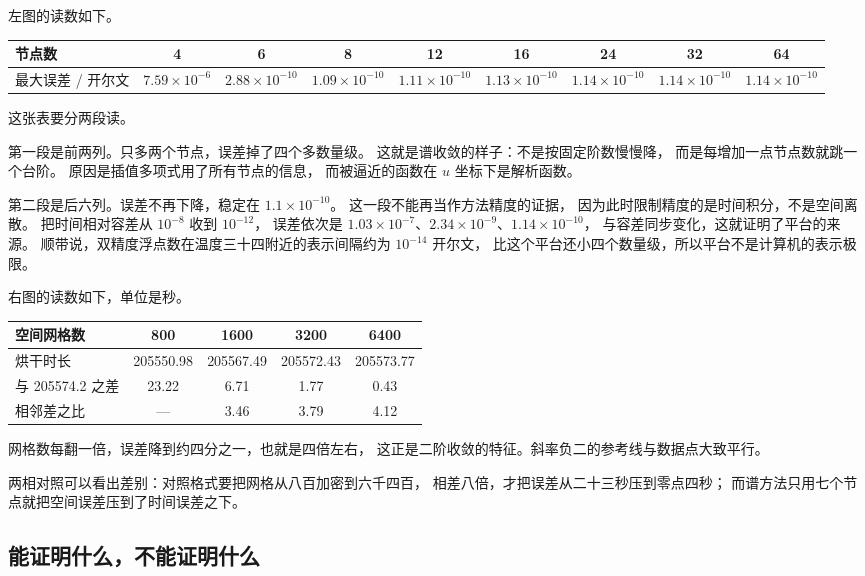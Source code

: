 \documentclass[11pt,a4paper]{article}
\begin{document}
左图的读数如下。

\begin{center}
\begin{tabular}{@{}lcccccccc@{}}
\toprule
节点数 & 4 & 6 & 8 & 12 & 16 & 24 & 32 & 64 \\
\midrule
最大误差 / 开尔文 & $7.59\times10^{-6}$ & $2.88\times10^{-10}$ & $1.09\times10^{-10}$
& $1.11\times10^{-10}$ & $1.13\times10^{-10}$ & $1.14\times10^{-10}$
& $1.14\times10^{-10}$ & $1.14\times10^{-10}$ \\
\bottomrule
\end{tabular}
\end{center}

这张表要分两段读。

第一段是前两列。只多两个节点，误差掉了四个多数量级。
这就是谱收敛的样子：不是按固定阶数慢慢降，
而是每增加一点节点数就跳一个台阶。
原因是插值多项式用了所有节点的信息，
而被逼近的函数在 $u$ 坐标下是解析函数。

第二段是后六列。误差不再下降，稳定在 $1.1\times10^{-10}$。
这一段不能再当作方法精度的证据，
因为此时限制精度的是时间积分，不是空间离散。
把时间相对容差从 $10^{-8}$ 收到 $10^{-12}$，
误差依次是 $1.03\times10^{-7}$、$2.34\times10^{-9}$、$1.14\times10^{-10}$，
与容差同步变化，这就证明了平台的来源。
顺带说，双精度浮点数在温度三十四附近的表示间隔约为 $10^{-14}$ 开尔文，
比这个平台还小四个数量级，所以平台不是计算机的表示极限。

右图的读数如下，单位是秒。

\begin{center}
\begin{tabular}{@{}lcccc@{}}
\toprule
空间网格数 & 800 & 1600 & 3200 & 6400 \\
\midrule
烘干时长 & 205550.98 & 205567.49 & 205572.43 & 205573.77 \\
与 205574.2 之差 & 23.22 & 6.71 & 1.77 & 0.43 \\
相邻差之比 & --- & 3.46 & 3.79 & 4.12 \\
\bottomrule
\end{tabular}
\end{center}

网格数每翻一倍，误差降到约四分之一，也就是四倍左右，
这正是二阶收敛的特征。斜率负二的参考线与数据点大致平行。

两相对照可以看出差别：对照格式要把网格从八百加密到六千四百，
相差八倍，才把误差从二十三秒压到零点四秒；
而谱方法只用七个节点就把空间误差压到了时间误差之下。

\subsection{能证明什么，不能证明什么}
\end{document}
